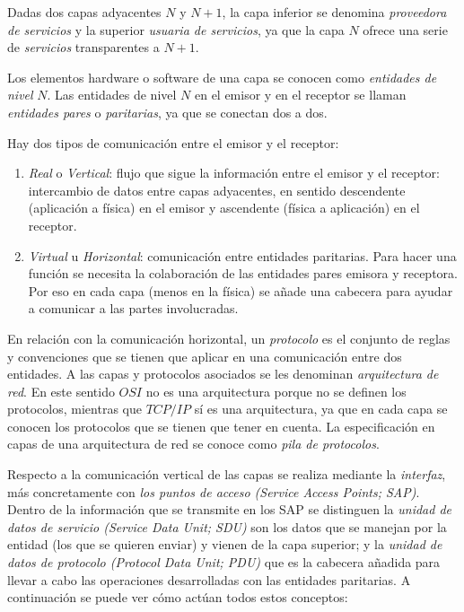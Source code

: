 \documentclass[10pt,a4paper,spanish]{report}
\begin{document}
Dadas dos capas adyacentes $N$ y $N+1$, la capa inferior se denomina \textit{\textcolor{tema1}{proveedora de servicios}} y la superior \textit{\textcolor{tema1}{usuaria de servicios}}, ya que la capa $N$ ofrece una serie de \textit{\textcolor{tema1}{servicios}} transparentes a $N+1$.

Los elementos hardware o software de una capa se conocen como \textcolor{tema1}{\textit{entidades de nivel} $N$}. Las entidades de nivel $N$ en el emisor y en el receptor se llaman \textit{\textcolor{tema1}{entidades pares}} o \textit{\textcolor{tema1}{paritarias}}, ya que se conectan dos a dos.

Hay dos tipos de comunicación entre el emisor y el receptor:

\begin{enumerate}[\color{tema1}{$\heartsuit$}]
  \item \textit{\textcolor{tema1}{Real}} o \textit{\textcolor{tema1}{Vertical}}: flujo que sigue la información entre el emisor y el receptor: intercambio de datos entre capas adyacentes, en sentido descendente (aplicación a física) en el emisor y ascendente (física a aplicación) en el receptor.
  \item \textit{\textcolor{tema1}{Virtual}} u \textit{\textcolor{tema1}{Horizontal}}: comunicación entre entidades paritarias. Para hacer una función se necesita la colaboración de las entidades pares emisora y receptora. Por eso en cada capa (menos en la física) se añade una cabecera para ayudar a comunicar a las partes involucradas.
\end{enumerate}

En relación con la comunicación horizontal, un \textit{\textcolor{tema1}{protocolo}} es el conjunto de reglas y convenciones que se tienen que aplicar en una comunicación entre dos entidades. A las capas y protocolos asociados se les denominan \textit{\textcolor{tema1}{arquitectura de red}}. En este sentido $OSI$ no es una arquitectura porque no se definen los protocolos, mientras que $TCP/IP$ sí es una arquitectura, ya que en cada capa se conocen los protocolos que se tienen que tener en cuenta. La especificación en capas de una arquitectura de red se conoce como \textit{\textcolor{tema1}{pila de protocolos}}.

Respecto a la comunicación vertical de las capas se realiza mediante la \textit{\textcolor{tema1}{interfaz}}, más concretamente con \textit{\textcolor{tema1}{los puntos de acceso (Service Access Points; SAP)}}. Dentro de la información que se transmite en los SAP se distinguen la \textit{\textcolor{tema1}{unidad de datos de servicio (Service Data Unit; SDU)}} son los datos que se manejan por la entidad (los que se quieren enviar) y vienen de la capa superior; y la \textit{\textcolor{tema1}{unidad de datos de protocolo (Protocol Data Unit; PDU)}} que es la cabecera añadida para llevar a cabo las operaciones desarrolladas con las entidades paritarias. A continuación se puede ver cómo actúan todos estos conceptos:
\end{document}
